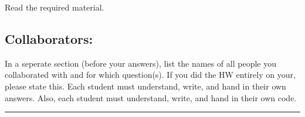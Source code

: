 \documentclass[12pt]{article}
\begin{document}
\begin{flushleft}
Read the required material.

\subsection*{Collaborators:}

In a seperate section (before your answers), list the names of all people you collaborated with and for
which question(s). If you did the HW entirely on your, please state
this.  Each student must understand, write, and hand in
their own answers. Also, each student must understand, write, and hand
in their own code.

\end{flushleft}
\hrule


\end{document}
